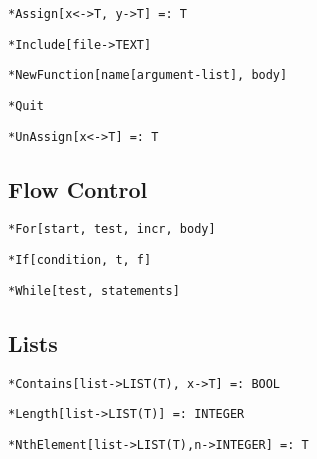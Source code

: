 \protect \large \begin{verbatim}
*Assign[x<->T, y->T] =: T
\end{verbatim} \normalsize

\protect \large \begin{verbatim}
*Include[file->TEXT]
\end{verbatim}\normalsize

\protect \large \begin{verbatim}
*NewFunction[name[argument-list], body]
\end{verbatim}\normalsize

\protect \large \begin{verbatim}
*Quit
\end{verbatim}\normalsize

\protect \large \begin{verbatim}
*UnAssign[x<->T] =: T
\end{verbatim}\normalsize

\medskip
\subsection{Flow Control}

\protect \large \begin{verbatim}
*For[start, test, incr, body]
\end{verbatim}\normalsize


\protect \large \begin{verbatim}
*If[condition, t, f]
\end{verbatim} \normalsize


\protect \large \begin{verbatim}
*While[test, statements]
\end{verbatim} \normalsize


\medskip
\subsection{Lists}

\protect \large \begin{verbatim}
*Contains[list->LIST(T), x->T] =: BOOL
\end{verbatim}\normalsize

\protect \large \begin{verbatim}
*Length[list->LIST(T)] =: INTEGER
\end{verbatim}\normalsize

\protect \large \begin{verbatim}
*NthElement[list->LIST(T),n->INTEGER] =: T 
\end{verbatim}\normalsize

